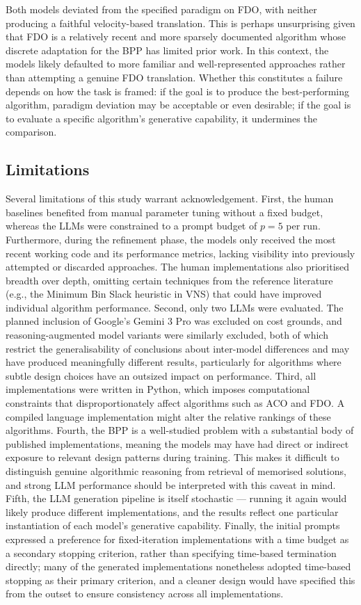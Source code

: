\documentclass[11pt]{article}
\begin{document}
Both models deviated from the specified paradigm on FDO, with neither producing a 
faithful velocity-based translation. This is perhaps unsurprising given that FDO is a 
relatively recent and more sparsely documented algorithm whose discrete adaptation for the 
BPP has limited prior work. In this context, the models likely defaulted to more 
familiar and well-represented approaches rather than attempting a genuine FDO 
translation. Whether this constitutes a failure depends on how the task is framed: if 
the goal is to produce the best-performing algorithm, paradigm deviation may be 
acceptable or even desirable; if the goal is to evaluate a specific algorithm's 
generative capability, it undermines the comparison.

\subsection{Limitations}
Several limitations of this study warrant acknowledgement. First, the human baselines benefited from manual parameter tuning without a fixed budget, whereas the LLMs were constrained to a prompt budget of $p=5$ per run. Furthermore, during the refinement phase, the models only received the most recent working code and its performance metrics, lacking visibility into previously attempted or discarded approaches. The human implementations also prioritised breadth over depth, omitting certain techniques from the reference literature (e.g., the Minimum Bin Slack heuristic in VNS) that could have improved individual algorithm performance. Second, only two LLMs were
evaluated. The planned inclusion of Google's Gemini 3 Pro was excluded on cost grounds,
and reasoning-augmented model variants were similarly excluded, both of which restrict
the generalisability of conclusions about inter-model differences and may have produced
meaningfully different results, particularly for algorithms where subtle design choices
have an outsized impact on performance. Third, all implementations were written in
Python, which imposes computational constraints that disproportionately affect algorithms such as ACO and FDO. A compiled language implementation
might alter the relative rankings of these algorithms. Fourth, the BPP is
a well-studied problem with a substantial body of published implementations, meaning
the models may have had direct or indirect exposure to relevant design patterns during
training. This makes it difficult to distinguish genuine algorithmic reasoning from
retrieval of memorised solutions, and strong LLM performance should be interpreted with
this caveat in mind. Fifth, the LLM generation pipeline is itself stochastic ---
running it again would likely produce different implementations, and the results reflect
one particular instantiation of each model's generative capability. Finally, the initial prompts expressed a preference for fixed-iteration
implementations with a time budget as a secondary stopping criterion, rather
than specifying time-based termination directly; many of the generated
implementations nonetheless adopted time-based stopping as their primary
criterion, and a cleaner design would have specified this from the outset to
ensure consistency across all implementations.
\end{document}
